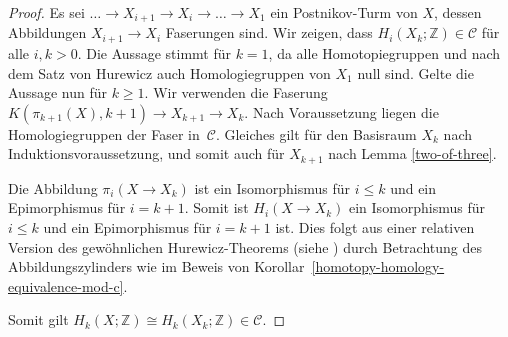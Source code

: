 \documentclass[11pt, a4paper, german]{article}
\theoremstyle{definition}
\theoremstyle{remark}
\newcommand{\Z}{\mathbb{Z}} %
\newcommand{\SC}{\mathcal{C}} %
\begin{document}
\begin{proof}
  Es sei $\ldots \to X_{i+1} \to X_i \to \ldots \to X_1$ ein Postnikov-Turm von $X$, dessen Abbildungen $X_{i+1} \to X_i$ Faserungen sind.
  Wir zeigen, dass $H_i(X_k; \Z) \in \SC$ für alle $i, k > 0$.
  Die Aussage stimmt für $k = 1$, da alle Homotopiegruppen und nach dem Satz von Hurewicz auch Homologiegruppen von $X_1$ null sind.
  Gelte die Aussage nun für $k \geq 1$.
  Wir verwenden die Faserung $K(\pi_{k+1}(X), k{+}1) \to X_{k+1} \to X_k$.
  Nach Voraussetzung liegen die Homologiegruppen der Faser in~$\SC$.
  Gleiches gilt für den Basisraum $X_k$ nach Induktionsvoraussetzung,
  und somit auch für $X_{k+1}$ nach Lemma \ref{two-of-three}.

  Die Abbildung $\pi_i(X \to X_k)$ ist ein Isomorphismus für $i \leq k$ und ein Epimorphismus für $i = k+1$.
  Somit ist $H_i(X \to X_k)$ ein Isomorphismus für $i \leq k$ und ein Epimorphismus für $i = k+1$ ist.
  Dies folgt aus einer relativen Version des gewöhnlichen Hurewicz-Theorems (siehe \cite[\mbox{} Thm 4.32]{hatcher:at}) durch Betrachtung des Abbildungszylinders wie im Beweis von Korollar~\ref{homotopy-homology-equivalence-mod-c}.

  Somit gilt $H_k(X; \Z) \cong H_k(X_k; \Z) \in \SC$.
\end{proof}
\end{document}

